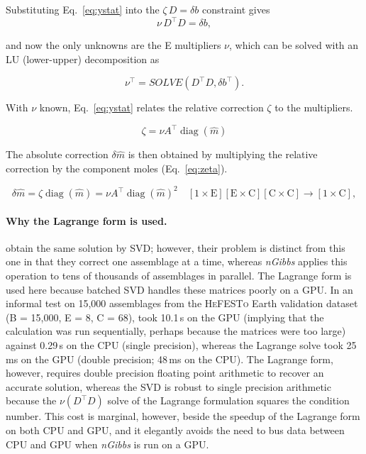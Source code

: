 Substituting Eq.~\eqref{eq:ystat} into the $\zeta\, D = \delta b$ constraint gives
\begin{equation}
  \nu\, D^{\!\top} D = \delta b,
\end{equation}

and now the only unknowns are the E multipliers $\nu$, which can be solved with an LU (lower-upper) decomposition as 

\begin{equation}
  \nu^{\!\top} = SOLVE(D^{\!\top} D, \delta b^{\!\top}) .
  \label{eq:nu}
\end{equation}

With $\nu$ known, Eq.~\eqref{eq:ystat} relates the relative correction $\zeta$ to the multipliers.

\begin{equation}
  \zeta = \nu A^{\!\top} \operatorname{diag}(\hat m)
\end{equation}

The absolute correction $\delta\hat m$ is then obtained by multiplying the relative correction by the component moles (Eq.~\eqref{eq:zeta}).

\begin{equation}
  \delta\hat m = \zeta \operatorname{diag}(\hat m) = \nu A^{\!\top} \operatorname{diag}(\hat m)^2
  \quad [1\times\text{E}][\text{E}\times\text{C}][\text{C}\times\text{C}] \to [1\times\text{C}],
  \label{eq:share}
\end{equation}

\paragraph{Why the Lagrange form is used.} \citet{asimow1998} obtain the same solution by
SVD; however, their problem is distinct from this one in that they correct one assemblage at a
time, whereas \emph{nGibbs} applies this operation to tens of thousands of assemblages in parallel. 
The Lagrange form is used here because batched SVD handles these matrices poorly on a GPU.
In an informal test on 15{,}000 assemblages from the \textsc{HeFESTo} Earth validation dataset 
(B = 15{,}000, E = 8, C = 68),  took 10.1\,s on the GPU (implying that the calculation was run 
sequentially, perhaps because the matrices were too large) against 0.29\,s on the CPU (single precision), whereas the Lagrange solve took 25\,ms 
on the GPU (double precision; 48\,ms on the CPU). The Lagrange form, however, requires double precision floating point arithmetic to recover an accurate solution,
whereas the SVD is robust to single precision arithmetic because the $\nu\left( D^{\!\top} D \right)$ solve of the Lagrange formulation
squares the condition number. This cost is marginal, however, beside the speedup of the Lagrange form on both CPU and GPU, and it elegantly
avoids the need to bus data between CPU and GPU when \emph{nGibbs} is run on a GPU.

